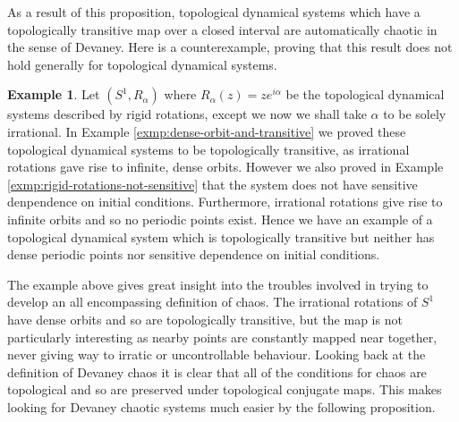 \documentclass[11pt,a4paper,oneside]{memoir}
\theoremstyle{plain}
\theoremstyle{definition}
\newtheorem{exmp}[thm]{Example}
\begin{document}
As a result of this proposition, topological dynamical systems which have a topologically transitive map over a closed interval are automatically chaotic in the sense of Devaney. Here is a counterexample, proving that this result does not hold generally for topological dynamical systems.

\begin{exmp}
    Let $(S^1, R_\alpha)$ where $R_\alpha(z) = ze^{i\alpha}$ be the topological dynamical systems described by rigid rotations, except we now we shall take $\alpha$ to be solely irrational. In Example \ref{exmp:dense-orbit-and-transitive} we proved these topological dynamical systems to be topologically transitive, as irrational rotations gave rise to infinite, dense orbits. However we also proved in Example \ref{exmp:rigid-rotations-not-sensitive} that the system does not have sensitive denpendence on initial conditions. Furthermore, irrational rotations give rise to infinite orbits and so no periodic points exist. Hence we have an example of a topological dynamical system which is topologically transitive but neither has dense periodic points nor sensitive dependence on initial conditions.
\end{exmp}

The example above gives great insight into the troubles involved in trying to develop an all encompassing definition of chaos. The irrational rotations of $S^1$ have dense orbits and so are topologically transitive, but the map is not particularly interesting as nearby points are constantly mapped near together, never giving way to irratic or uncontrollable behaviour. Looking back at the definition of Devaney chaos it is clear that all of the conditions for chaos are topological and so are preserved under topological conjugate maps. This makes looking for Devaney chaotic systems much easier by the following proposition.
\end{document}
